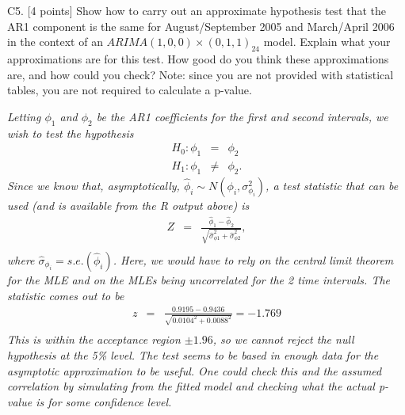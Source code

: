 \documentclass[11pt]{article}
\begin{document}
C5. [4 points] Show how to carry out an approximate hypothesis test that the AR1 component is the same for August/September 2005 and March/April 2006 in the context of an
 $ARIMA(1,0,0){\times}(0,1,1)_{24}$ model.
Explain what your approximations are for this test. How good do you
think these approximations are, and how could you check? Note: since
you are not provided with statistical tables, you are not required
to calculate a p-value.

{\it
Letting $\phi_1$ and $\phi_2$ be the AR1 coefficients for the first and second intervals, we wish to test the hypothesis 
\begin{eqnarray*}
H_0: \phi_1 &=& \phi_2\\
H_1: \phi_1 &\neq& \phi_2.
\end{eqnarray*}
Since we know that, asymptotically, $\hat{\phi}_i \sim
N(\phi_i,\sigma^2_{\phi_i})$, a test statistic that can be
used (and is available from the R output above) is
\begin{eqnarray*}
Z &=& \frac{\hat{\phi}_1 - \hat{\phi}_2}{\sqrt{\hat{\sigma}^2_{\phi 1} + \hat{\sigma}^2_{\phi 2}}},\\
\end{eqnarray*}
where $\hat{\sigma}_{\phi_i} = s.e.(\hat{\phi}_i)$. Here, we would
have to rely on the central limit theorem for the MLE and on the
MLEs being uncorrelated for the 2 time intervals. The statistic
comes out to be
\begin{eqnarray*}
z &=& \frac{0.9195 - 0.9436}{\sqrt{0.0104^2 + 0.0088^2}} = -1.769\\
\end{eqnarray*}
This is within the acceptance region $\pm 1.96$, so we cannot reject the null hypothesis at the 5\% level.
 The test seems to be based in enough data for the
asymptotic approximation to be useful. One could check this and the
assumed correlation by simulating from the fitted model and checking
what the actual p-value is for some confidence level.
}
\end{document}
